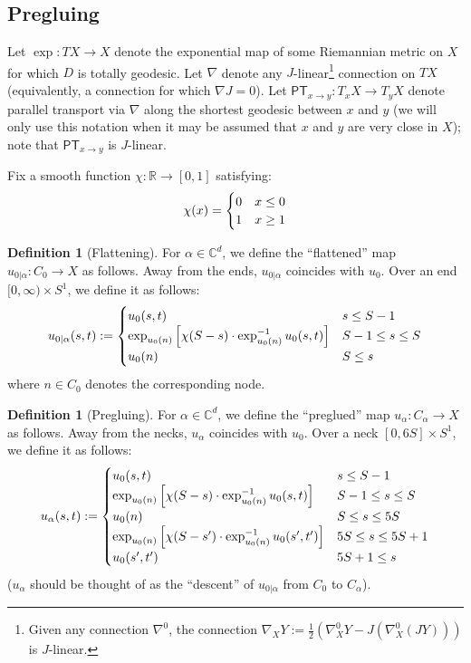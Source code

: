 \documentclass[12pt]{article}
\theoremstyle{definition}
\newtheorem{definition}[theorem]{Definition}
\theoremstyle{remark}
\numberwithin{equation}{subsection}
\newcommand{\CC}{\mathbb C}
\newcommand{\RR}{\mathbb R}
\newcommand{\PT}{\mathsf{PT}}
\begin{document}
\subsection{Pregluing}

Let $\exp:TX\to X$ denote the exponential map of some Riemannian metric on $X$ for which $D$ is totally geodesic.  Let $\nabla$ denote any $J$-linear\footnote{Given any connection $\nabla^0$, the connection $\nabla_XY:=\frac 12(\nabla^0_XY-J(\nabla^0_X(JY)))$ is $J$-linear.} connection on $TX$ (equivalently, a connection for which $\nabla J=0$).  Let $\PT_{x\to y}:T_xX\to T_yX$ denote parallel transport via $\nabla$ along the shortest geodesic between $x$ and $y$ (we will only use this notation when it may be assumed that $x$ and $y$ are very close in $X$); note that $\PT_{x\to y}$ is $J$-linear.

Fix a smooth function $\chi:\RR\to[0,1]$ satisfying:
\begin{equation}
\chi(x)=\begin{cases}0&x\leq 0\cr 1&x\geq 1\end{cases}
\end{equation}

\begin{definition}[Flattening]
For $\alpha\in\CC^d$, we define the ``flattened'' map $u_{0|\alpha}:C_0\to X$ as follows.  Away from the ends, $u_{0|\alpha}$ coincides with $u_0$.  Over an end $[0,\infty)\times S^1$, we define it as follows:
\begin{equation}
u_{0|\alpha}(s,t):=\begin{cases}
u_0(s,t)&s\leq S-1\cr
\exp_{u_0(n)}\left[\chi(S-s)\cdot\exp_{u_0(n)}^{-1}u_0(s,t)\right]&S-1\leq s\leq S\cr
u_0(n)&S\leq s
\end{cases}
\end{equation}
where $n\in C_0$ denotes the corresponding node.
\end{definition}

\begin{definition}[Pregluing]
For $\alpha\in\CC^d$, we define the ``preglued'' map $u_\alpha:C_\alpha\to X$ as follows.  Away from the necks, $u_\alpha$ coincides with $u_0$.  Over a neck $[0,6S]\times S^1$, we define it as follows:
\begin{equation}
u_\alpha(s,t):=\begin{cases}
u_0(s,t)&s\leq S-1\cr
\exp_{u_0(n)}\left[\chi(S-s)\cdot\exp_{u_0(n)}^{-1}u_0(s,t)\right]&S-1\leq s\leq S\cr
u_0(n)&S\leq s\leq 5S\cr
\exp_{u_0(n)}\left[\chi(S-s')\cdot\exp_{u_0(n)}^{-1}u_0(s',t')\right]&5S\leq s\leq 5S+1\cr
u_0(s',t')&5S+1\leq s
\end{cases}
\end{equation}
($u_\alpha$ should be thought of as the ``descent'' of $u_{0|\alpha}$ from $C_0$ to $C_\alpha$).
\end{definition}
\end{document}
